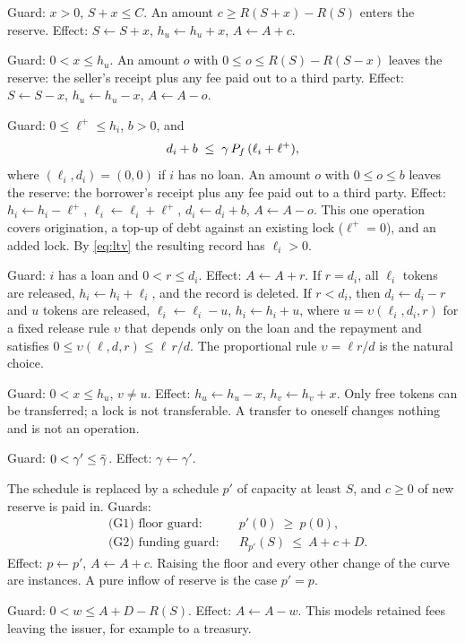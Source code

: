\begin{description}[leftmargin=1.2em,itemsep=3pt]
\item[\op{Buy}$(u,x)$.] Guard: $x>0$, $S+x\le C$. An amount $c\ge R(S+x)-R(S)$ enters the reserve. Effect: $S\gets S+x$, $h_u\gets h_u+x$, $A\gets A+c$.
\item[\op{Sell}$(u,x)$.] Guard: $0<x\le h_u$. An amount $o$ with $0\le o\le R(S)-R(S-x)$ leaves the reserve: the seller's receipt plus any fee paid out to a third party. Effect: $S\gets S-x$, $h_u\gets h_u-x$, $A\gets A-o$.
\item[\op{Borrow}$(i,\ell^+,b)$.] Guard: $0\le \ell^+\le h_i$, $b>0$, and
\begin{equation}\label{eq:ltv}
d_i+b\;\le\;\gamma\,P_f\,(\ell_i+\ell^+),
\end{equation}
where $(\ell_i,d_i)=(0,0)$ if $i$ has no loan. An amount $o$ with $0\le o\le b$ leaves the reserve: the borrower's receipt plus any fee paid out to a third party. Effect: $h_i\gets h_i-\ell^+$, $\ell_i\gets \ell_i+\ell^+$, $d_i\gets d_i+b$, $A\gets A-o$. This one operation covers origination, a top-up of debt against an existing lock ($\ell^+=0$), and an added lock. By \eqref{eq:ltv} the resulting record has $\ell_i>0$.
\item[\op{Repay}$(i,r)$.] Guard: $i$ has a loan and $0<r\le d_i$. Effect: $A\gets A+r$. If $r=d_i$, all $\ell_i$ tokens are released, $h_i\gets h_i+\ell_i$, and the record is deleted. If $r<d_i$, then $d_i\gets d_i-r$ and $u$ tokens are released, $\ell_i\gets\ell_i-u$, $h_i\gets h_i+u$, where $u=\upsilon(\ell_i,d_i,r)$ for a fixed release rule $\upsilon$ that depends only on the loan and the repayment and satisfies $0\le\upsilon(\ell,d,r)\le \ell\,r/d$. The proportional rule $\upsilon=\ell r/d$ is the natural choice.
\item[\op{Transfer}$(u,v,x)$.] Guard: $0<x\le h_u$, $v\ne u$. Effect: $h_u\gets h_u-x$, $h_v\gets h_v+x$. Only free tokens can be transferred; a lock is not transferable. A transfer to oneself changes nothing and is not an operation.
\item[\op{SetLTV}$(\gamma')$.] Guard: $0<\gamma'\le\bar\gamma$. Effect: $\gamma\gets\gamma'$.
\item[\op{Reshape}$(p',c)$.] The schedule is replaced by a schedule $p'$ of capacity at least $S$, and $c\ge0$ of new reserve is paid in. Guards:
\begin{align}
&\text{(G1) floor guard:} && p'(0)\ \ge\ p(0), \label{eq:G1}\\
&\text{(G2) funding guard:} && R_{p'}(S)\ \le\ A+c+D. \label{eq:G2}
\end{align}
Effect: $p\gets p'$, $A\gets A+c$. Raising the floor and every other change of the curve are instances. A pure inflow of reserve is the case $p'=p$.
\item[\op{Skim}$(w)$.] Guard: $0<w\le A+D-R(S)$. Effect: $A\gets A-w$. This models retained fees leaving the issuer, for example to a treasury.
\end{description}

